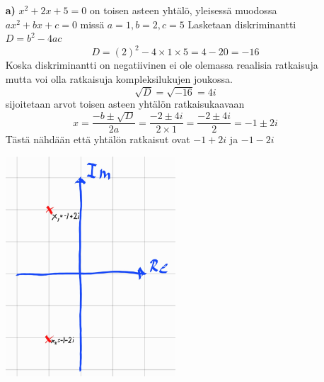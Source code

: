 \documentclass{article}
\begin{document}
\begin{itemize}
    \item [{\textbf{a)}}] $x^2 + 2x + 5 = 0$ on toisen asteen yhtälö, yleisessä muodossa $ax^2 + bx + c = 0$ 
    missä $a = 1, b = 2, c = 5$\newline
    Lasketaan diskriminantti $D = b^2 - 4ac$
    \[
        D = (2)^2 - 4 \times 1 \times 5 = 4 - 20 = -16
    \]
    Koska diskriminantti on negatiivinen ei ole olemassa reaalisia ratkaisuja mutta voi olla ratkaisuja kompleksilukujen joukossa.
    \[
        \sqrt{D} = \sqrt{-16} = 4i
    \]
    sijoitetaan arvot toisen asteen yhtälön ratkaisukaavaan
    \[
        x = \frac{-b \pm \sqrt{D}}{2a} = \frac{-2 \pm 4i}{2 \times 1} = \frac{-2 \pm 4i}{2} = -1 \pm 2i
    \]
    Tästä nähdään että yhtälön ratkaisut ovat $-1 + 2i$ ja $-1 - 2i$

    \begin{center}
        \includegraphics[width=0.5\textwidth]{harj6teht6a.jpg}
    \end{center}



\end{itemize}
\end{document}
